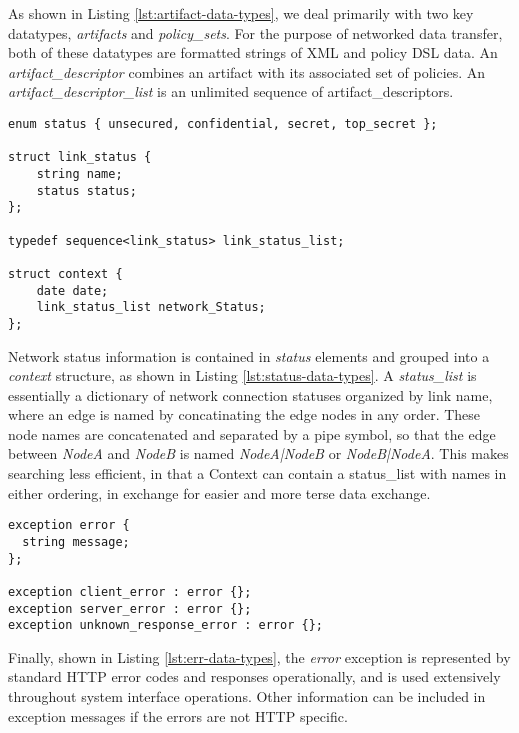 As shown in Listing \ref{lst:artifact-data-types}, we deal primarily with two key datatypes, \emph{artifacts} and \emph{policy\_sets}.  For the purpose of networked data transfer, both of these datatypes are formatted strings of XML and policy DSL data.  An \emph{artifact\_descriptor} combines an artifact with its associated set of policies.  An \emph{artifact\_descriptor\_list} is an unlimited sequence of artifact\_descriptors.

\begin{lstlisting}[language=idl, label=lst:status-data-types, caption=Key Status Dataypes]
enum status { unsecured, confidential, secret, top_secret };

struct link_status {
	string name;
	status status;
};

typedef sequence<link_status> link_status_list;

struct context {
	date date;
	link_status_list network_Status;
};
\end{lstlisting}

Network status information is contained in \emph{status} elements and grouped into a \emph{context} structure, as shown in Listing \ref{lst:status-data-types}.  A \emph{status\_list} is essentially a dictionary of network connection statuses organized by link name, where an edge is named by concatinating the edge nodes in any order.  These node names are concatenated and separated by a pipe symbol, so that the edge between \textit{NodeA} and \textit{NodeB} is named \textit{NodeA|NodeB} or \textit{NodeB|NodeA}.  This makes searching less efficient, in that a Context can contain a status\_list with names in either ordering, in exchange for easier and more terse data exchange.

\begin{lstlisting}[language=idl, label=lst:err-data-types, caption=Key Error Dataypes]
exception error {
  string message;
};

exception client_error : error {};
exception server_error : error {};
exception unknown_response_error : error {};
\end{lstlisting}

Finally, shown in Listing \ref{lst:err-data-types}, the \emph{error} exception is represented by standard HTTP error codes and responses operationally, and is used extensively throughout system interface operations.  Other information can be included in exception messages if the errors are not HTTP specific.

%

